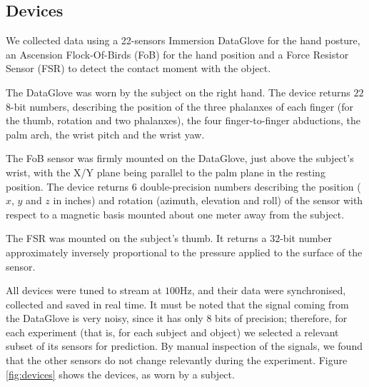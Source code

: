 \subsection*{Devices}

We collected data using a 22-sensors Immersion DataGlove for the hand
posture, an Ascension Flock-Of-Birds (FoB) for the hand position and a
Force Resistor Sensor (FSR) to detect the contact moment with the
object.

The DataGlove was worn by the subject on the right hand. The device
returns $22$ $8$-bit numbers, describing the position of the three
phalanxes of each finger (for the thumb, rotation and two phalanxes),
the four finger-to-finger abductions, the palm arch, the wrist pitch
and the wrist yaw.

The FoB sensor was firmly mounted on the DataGlove, just above the
subject's wrist, with the X/Y plane being parallel to the palm plane
in the resting position. The device returns $6$ double-precision
numbers describing the position ($x$, $y$ and $z$ in inches) and
rotation (azimuth, elevation and roll) of the sensor with respect to a
magnetic basis mounted about one meter away from the subject.

The FSR was mounted on the subject's thumb. It returns a $32$-bit
number approximately inversely proportional to the pressure applied to
the surface of the sensor.

All devices were tuned to stream at $100$Hz, and their data were
synchronised, collected and saved in real time. It must be noted that
the signal coming from the DataGlove is very noisy, since it has only
$8$ bits of precision; therefore, for each experiment (that is, for
each subject and object) we selected a relevant subset of its sensors
for prediction. By manual inspection of the signals, we found that the
other sensors do not change relevantly during the experiment. Figure
\ref{fig:devices} shows the devices, as worn by a subject.

